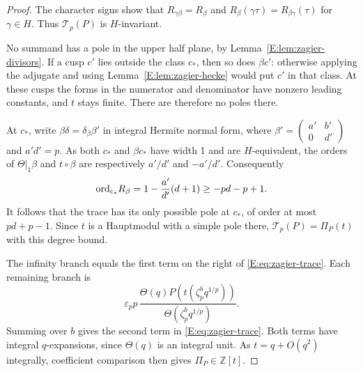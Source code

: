 \documentclass[11pt,a4paper]{article}
\theoremstyle{definition}\newtheorem{definition}[theorem]{Definition}
\theoremstyle{remark}\newtheorem{remark}[theorem]{Remark}
\numberwithin{equation}{section}
\begin{document}
\begin{proof}
The character signs show that \(R_{\gamma\beta}=R_\beta\)
and \(R_\beta(\gamma\tau)=R_{\beta\gamma}(\tau)\) for
\(\gamma\in H\).  Thus \(\mathcal T_p(P)\) is \(H\)-invariant.

No summand has a pole in the upper half plane, by
Lemma~\ref{E:lem:zagier-divisors}.  If a cusp \(c'\) lies outside
the class \(c_*\), then so does \(\beta c'\): otherwise applying
the adjugate and using Lemma~\ref{E:lem:zagier-hecke} would put
\(c'\) in that class.  At these cusps the forms in the numerator
and denominator have nonzero leading constants, and \(t\)
stays finite.  There are therefore no poles there.

At \(c_*\), write
\(\beta\delta=\delta_\beta\beta'\) in integral Hermite normal
form, where
\(\beta'=\left(\begin{smallmatrix}a'&b'\\0&d'\end{smallmatrix}\right)\)
and \(a'd'=p\).  As both \(c_*\) and \(\beta c_*\) have width
1 and are \(H\)-equivalent, the orders of
\(\Theta|_1\beta\) and \(t\circ\beta\) are respectively
\(a'/d'\) and \(-a'/d'\).
Consequently
\[
 {\rm ord}_{c_*}R_\beta
   =1-\frac{a'}{d'}(d+1)\ge -pd-p+1.
\]
It follows that the trace has its only possible pole at
\(c_*\), of order at most \(pd+p-1\).
Since \(t\) is a Hauptmodul with a simple pole there,
\(\mathcal T_p(P)=\Pi_P(t)\) with this degree bound.

The infinity branch equals the first term on the right of
\eqref{E:eq:zagier-trace}.  Each remaining branch is
\[
 \varepsilon_p p\,
 \frac{\Theta(q)P(t(\zeta_p^bq^{1/p}))}
      {\Theta(\zeta_p^bq^{1/p})}.
\]
Summing over \(b\) gives the second term in
\eqref{E:eq:zagier-trace}.  Both terms have integral
\(q\)-expansions, since \(\Theta(q)\) is an integral unit.
As \(t=q+O(q^2)\) integrally, coefficient comparison then gives
\(\Pi_P\in\mathbb Z[t]\).
\end{proof}
\end{document}
